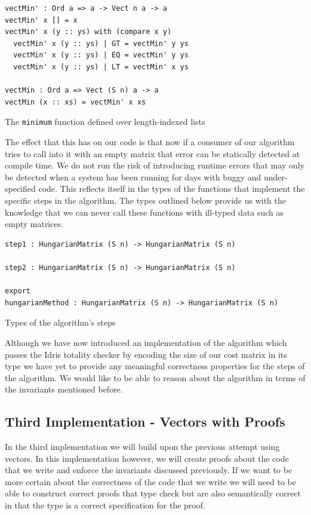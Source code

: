 \documentclass[a4paper, notitlepage]{report}
\begin{document}
\begin{listing}[H]
\begin{verbatim}
vectMin' : Ord a => a -> Vect n a -> a
vectMin' x [] = x
vectMin' x (y :: ys) with (compare x y)
  vectMin' x (y :: ys) | GT = vectMin' y ys
  vectMin' x (y :: ys) | EQ = vectMin' y ys
  vectMin' x (y :: ys) | LT = vectMin' x ys

vectMin : Ord a => Vect (S n) a -> a
vectMin (x :: xs) = vectMin' x xs
\end{verbatim}
\caption{The \texttt{minimum} function defined over length-indexed lists}
\end{listing}

The effect that this has on our code is that now if a consumer of our algorithm
tries to call into it with an empty matrix that error can be statically detected
at compile time. We do not run the risk of introducing runtime errors that may
only be detected when a system has been running for days with buggy and
under-specified code. This reflects itself in the types of the functions that
implement the specific steps in the algorithm. The types outlined below provide
us with the knowledge that we can never call these functions with ill-typed data
such as empty matrices.

\begin{listing}[H]
\begin{verbatim}
step1 : HungarianMatrix (S n) -> HungarianMatrix (S n)

step2 : HungarianMatrix (S n) -> HungarianMatrix (S n)

export
hungarianMethod : HungarianMatrix (S n) -> HungarianMatrix (S n)
\end{verbatim}
\caption{Types of the algorithm's steps}
\end{listing}

Although we have now introduced an implementation of the algorithm which passes
the Idris totality checker by encoding the size of our cost matrix in its type
we have yet to provide any meaningful correctness properties for the steps of
the algorithm. We would like to be able to reason about the algorithm in terms
of the invariants mentioned before.

\subsection{Third Implementation - Vectors with Proofs}
\label{sec:org1033782}
In the third implementation we will build upon the previous attempt using
vectors. In this implementation however, we will create proofs about the code
that we write and enforce the invariants discussed previously. If we want to be
more certain about the correctness of the code that we write we will need to be
able to construct correct proofs that type check but are also semantically
correct in that the type is a correct specification for the proof.
\end{document}
